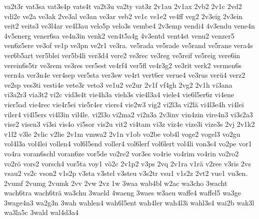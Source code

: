 {    va2t3r
    vat3sa
    vat3s4p
    vats4t
    va2t3u
    va2ty
    vat3z
    2v1au
    2v1ax
    2vb2
    2v1c
    2vd2
    vdi2e
    ve2a
    ve3ak
    2ve3al
    ve3an
    ve3ar
    veb2
    ve1c
    ve1e2
    ve4ff
    veg2
    2v3eig
    2v3ein
    veit2
    veits3
    ve3l4ar
    ve4l3au
    velo5p
    velo3s
    vembe4
    2v3emp
    vendi4
    4v3endu
    vene4n
    4v5energ
    vener6sa
    ve4n3in
    venk2
    ven4t5a4g
    4v3entd
    vent4st
    venu2
    venzer5
    ven6z5ere
    ve3of
    ve1p
    ve3pn
    ve2r1
    ve3ra.
    ve5rada
    ve5rade
    ve5rand
    ve5rane
    vera4s
    ver6b5art
    ver5blei
    ver5b4li
    ver3d4
    vere2
    ve3rec
    ve3reg
    ve5reif
    ve5reig
    vere6in
    verein6s5tr
    ve3rem
    ve3res
    ver5est
    ve4rf4
    ver5fl
    ve4r3g2
    ve3rit
    verk2
    vermen6s
    vern4a
    ver3n4e
    ver4sep
    ver5sta
    ver3sw
    ve4rt
    vert6er
    verue4
    ve3rus
    verü4
    verz2
    ve2sp
    ves3ti
    vesti4e
    vete3r
    veto3
    ve1u2
    ve2ur
    2v1f
    vf4gh
    2vg2
    2v1h
    vi3ana
    vi3a2r3
    via3t2
    vi2c
    vid3s4t
    vie4h3a
    vieh3s
    vie4l3a4
    viele4
    vie6l5er6z
    vi4ene
    vier5ad
    vie4rec
    vie4r5ei
    vie5r4er
    viers4
    vie2w3
    vig2
    vi2l3a
    vi2lä
    vi4l3e4h
    vi4lei
    viler4
    vi4l5ers
    vi4l3in
    vil4le.
    vi2l3o
    vi2ma2
    vi2n3a
    2v3inv
    vin4zin
    vire4n3
    vi3s2a3
    vise2
    visen3
    vi3si
    vis4o
    vi5sor
    vis2u
    vit2
    vi4tam
    vi3z
    viz4e
    vize3i
    vize3s
    2vj
    2v1k2
    v1l2
    v3le
    2vlic
    v2lie
    2v1m
    vmwa2
    2v1n
    v1ob
    vo2be
    vob4l
    voge2
    vogel3
    vo2gu
    vol4l3a
    vol4lei
    vollen4
    vol6l5end
    voller4
    vol6lerf
    vol6lert
    vol4li
    von3s4
    vo2pe
    vor1
    vo4ra
    voran6schl
    voran6ze
    vor5de
    vo2re2
    vor3es
    vo4rie
    vo4rim
    vo4rin
    vo2ro2
    vo2rö
    vors2
    vorsch4
    vor5ta
    voy1
    vö2c
    2v1p2
    v3ps
    2vq
    2v1ra
    v1rä
    v2ree
    v3ris
    2vs
    vsau2
    vs2c
    vson2
    v1s2p
    v3sta
    v3stel
    v3steu
    v3s2tr
    vsu1
    v1s2z
    2vt2
    vue1
    vu3en.
    2vumf
    2vumg
    2vumk
    2vv
    2vw
    2vz
    1w
    3waa
    wab4bl
    w2ac
    wa3cho
    3wacht
    wach6tra
    wach6trä
    wa3chu
    3waeld
    4waeng
    3waes
    w3aeu
    waffe4
    waffel5
    wa3ge
    3wage4n3
    wa2g3n
    3wah
    wahlen4
    wah6l5ent
    wah4ler
    wah4l3i
    wahl3s4
    wai2b
    wak3l
    wa3la5c
    3wald
    wal4d3a4
}
